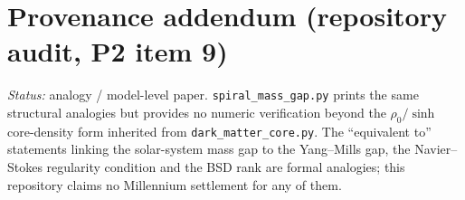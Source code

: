 \documentclass[12pt]{article}
\begin{document}
\section*{Provenance addendum (repository audit, P2 item 9)}

{\small
\emph{Status:} analogy / model-level paper.  \texttt{spiral\_mass\_gap.py}
prints the same structural analogies but provides no numeric verification
beyond the $\rho_0/\sinh$ core-density form inherited from
\texttt{dark\_matter\_core.py}.  The ``equivalent to'' statements linking
the solar-system mass gap to the Yang--Mills gap, the Navier--Stokes
regularity condition and the BSD rank are formal analogies; this repository
claims no Millennium settlement for any of them.}
\end{document}
